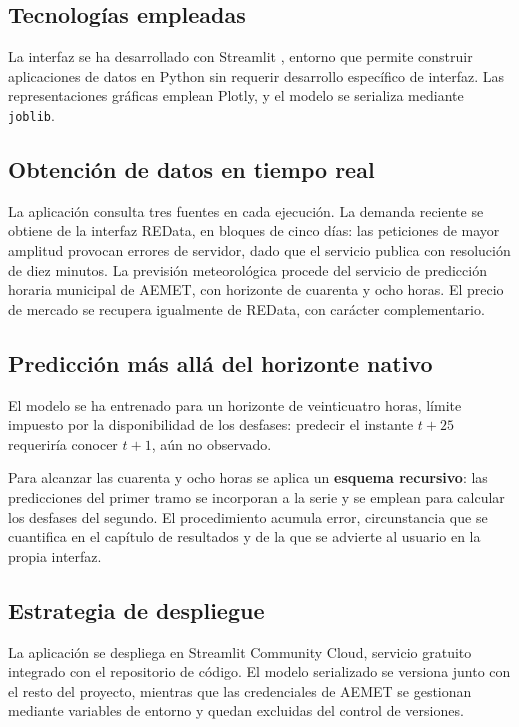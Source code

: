 \subsection*{Tecnologías empleadas}

La interfaz se ha desarrollado con Streamlit \parencite{streamlit}, entorno que
permite construir aplicaciones de datos en Python sin requerir desarrollo
específico de interfaz. Las representaciones gráficas emplean Plotly, y el modelo
se serializa mediante \texttt{joblib}.

\subsection*{Obtención de datos en tiempo real}

La aplicación consulta tres fuentes en cada ejecución. La demanda reciente se
obtiene de la interfaz REData, en bloques de cinco días: las peticiones de mayor
amplitud provocan errores de servidor, dado que el servicio publica con resolución
de diez minutos. La previsión meteorológica procede del servicio de predicción
horaria municipal de AEMET, con horizonte de cuarenta y ocho horas. El precio de
mercado se recupera igualmente de REData, con carácter complementario.

\subsection*{Predicción más allá del horizonte nativo}

El modelo se ha entrenado para un horizonte de veinticuatro horas, límite
impuesto por la disponibilidad de los desfases: predecir el instante $t+25$
requeriría conocer $t+1$, aún no observado.

Para alcanzar las cuarenta y ocho horas se aplica un \textbf{esquema recursivo}:
las predicciones del primer tramo se incorporan a la serie y se emplean para
calcular los desfases del segundo. El procedimiento acumula error, circunstancia
que se cuantifica en el capítulo de resultados y de la que se advierte al usuario
en la propia interfaz.

\subsection*{Estrategia de despliegue}

La aplicación se despliega en Streamlit Community Cloud, servicio gratuito
integrado con el repositorio de código. El modelo serializado se versiona junto
con el resto del proyecto, mientras que las credenciales de AEMET se gestionan
mediante variables de entorno y quedan excluidas del control de versiones.


